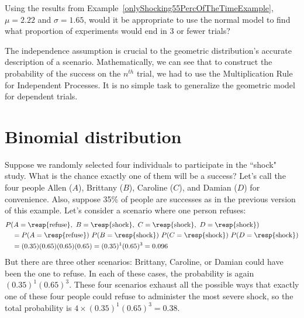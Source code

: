 \begin{exercisewrap}
\begin{nexercise}
Using the results from Example~\ref{onlyShocking55PercOfTheTimeExample}, $\mu = 2.22$ and $\sigma = 1.65$, would it be appropriate to use the normal model to find what proportion of experiments would end in 3 or fewer trials?\footnotemark
\end{nexercise}
\end{exercisewrap}

The independence assumption is crucial to the geometric distribution's accurate description of a scenario. Mathematically, we can see that to construct the probability of the success on the $n^{th}$ trial, we had to use the Multiplication Rule for Independent Processes. It is no simple task to generalize the geometric model for dependent trials.




\section{Binomial distribution}
\label{binomialModel}


\begin{examplewrap}
\begin{nexample}{Suppose we randomly selected four individuals to participate in the ``shock" study. What is the chance exactly one of them will be a success?  Let's call the four people Allen ($A$), Brittany ($B$), Caroline ($C$), and Damian ($D$) for convenience. Also, suppose 35\% of people are successes as in the previous version of this example.}\label{oneRefuser}
Let's consider a scenario where one person refuses:
\begin{align*}
&P(A=\text{\resp{refuse}},\text{ }B=\text{\resp{shock}},
    \text{ }C=\text{\resp{shock}},\text{ }D=\text{\resp{shock}}) \\
  &\quad = P(A=\text{\resp{refuse}})\ 
      P(B=\text{\resp{shock}})\ 
      P(C=\text{\resp{shock}})\ P(D=\text{\resp{shock}}) \\
  &\quad =  (0.35)  (0.65)  (0.65)  (0.65)
      = (0.35)^1 (0.65)^3
      = 0.096
\end{align*}
But there are three other scenarios: Brittany, Caroline, or Damian could have been the one to refuse. In each of these cases, the probability is again $(0.35)^1(0.65)^3$. These four scenarios exhaust all the possible ways that exactly one of these four people could refuse to administer the most severe shock, so the total probability is $4\times(0.35)^1(0.65)^3 = 0.38$.
\end{nexample}
\end{examplewrap}

